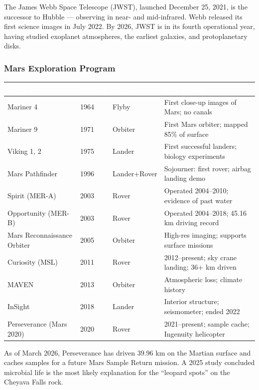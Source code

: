 \documentclass[11pt,letterpaper]{article}
\newcommand{\tableheader}[1]{\textbf{\sffamily\textcolor{white}{#1}}}
\begin{document}
The James Webb Space Telescope (JWST), launched December 25, 2021, is the successor to Hubble --- observing in near- and mid-infrared. Webb released its first science images in July 2022. By 2026, JWST is in its fourth operational year, having studied exoplanet atmospheres, the earliest galaxies, and protoplanetary disks.

\subsubsection{Mars Exploration Program}

\begin{center}
\begin{tabularx}{\textwidth}{L{3cm}L{1.8cm}L{2cm}X}
\toprule
{}
\tableheader{Mission} & \tableheader{Launch} & \tableheader{Type} & \tableheader{Key Result} \\
\midrule
Mariner 4 & 1964 & Flyby & First close-up images of Mars; no canals \\
Mariner 9 & 1971 & Orbiter & First Mars orbiter; mapped 85\% of surface \\
Viking 1, 2 & 1975 & Lander & First successful landers; biology experiments \\
Mars Pathfinder & 1996 & Lander+Rover & Sojourner: first rover; airbag landing demo \\
Spirit (MER-A) & 2003 & Rover & Operated 2004--2010; evidence of past water \\
Opportunity (MER-B) & 2003 & Rover & Operated 2004--2018; 45.16 km driving record \\
Mars Reconnaissance Orbiter & 2005 & Orbiter & High-res imaging; supports surface missions \\
Curiosity (MSL) & 2011 & Rover & 2012--present; sky crane landing; 36+ km driven \\
MAVEN & 2013 & Orbiter & Atmospheric loss; climate history \\
InSight & 2018 & Lander & Interior structure; seismometer; ended 2022 \\
Perseverance (Mars 2020) & 2020 & Rover & 2021--present; sample cache; Ingenuity helicopter \\
\bottomrule
\end{tabularx}
\end{center}

As of March 2026, Perseverance has driven 39.96 km on the Martian surface and caches samples for a future Mars Sample Return mission. A 2025 study concluded microbial life is the most likely explanation for the ``leopard spots'' on the Cheyava Falls rock.
\end{document}
